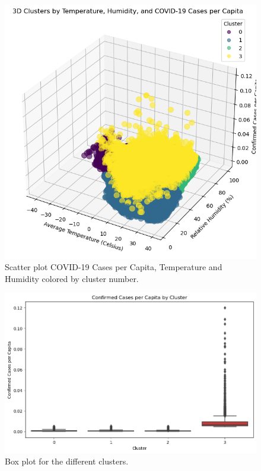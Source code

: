 \documentclass[sigconf,screen,nonacm]{acmart}
\begin{document}
\begin{figure}[H]
  \centering
  \includegraphics[width=\linewidth]{Figures/3DClusters.PNG}
  \caption{Scatter plot COVID-19 Cases per Capita, Temperature and Humidity colored by cluster number.}
  \label{fig:3D-Cluster}
\end{figure}

\begin{figure}[H]
  \centering
  \includegraphics[width=\linewidth]{Figures/confirmedPerCluster.png}
  \caption{Box plot for the different clusters.}
  \label{fig:confirmedPerCluster}
\end{figure}
\end{document}
